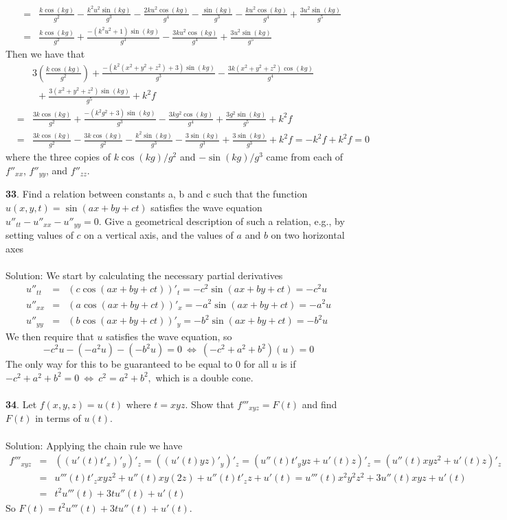 \documentclass[12pt]{amsbook}
\begin{document}
\begin{enumerate}
\begin{eqnarray*}
&=&\frac{k\cos(kg)}{g^2}-\frac{k^2u^2\sin(kg)}{g^3}-\frac{2ku^2\cos(kg)}{g^4}-\frac{\sin(kg)}{g^3}-\frac{ku^2\cos(kg)}{g^4}+\frac{3u^2\sin(kg)}{g^5} \\
&=&\frac{k\cos(kg)}{g^2}+\frac{-(k^2u^2+1)\sin(kg)}{g^3}-\frac{3ku^2\cos(kg)}{g^4}+\frac{3u^2\sin(kg)}{g^5}
\end{eqnarray*}
Then we have that
\begin{eqnarray*}
&&3(\frac{k\cos(kg)}{g^2})+\frac{-(k^2(x^2+y^2+z^2)+3)\sin(kg)}{g^3}-\frac{3k(x^2+y^2+z^2)\cos(kg)}{g^4} \\
&& \ \ +\frac{3(x^2+y^2+z^2)\sin(kg)}{g^5}+k^2f \\
&=&\frac{3k\cos(kg)}{g^2}+\frac{-(k^2g^2+3)\sin(kg)}{g^3}-\frac{3kg^2\cos(kg)}{g^4}+\frac{3g^2\sin(kg)}{g^5}+k^2f \\
&=&\frac{3k\cos(kg)}{g^2}-\frac{3k\cos(kg)}{g^2}-\frac{k^2\sin(kg)}{g^3}-\frac{3\sin(kg)}{g^3}+\frac{3\sin(kg)}{g^3}+k^2f=-k^2f+k^2f=0
\end{eqnarray*} 
where the three copies of $k\cos(kg)/g^2$ and $-\sin(kg)/g^3$ came from each of $f''_{xx}$, $f''_{yy}$, and $f''_{zz}$. 
\\
\end{enumerate}
{\small\bf 33}. Find a relation between constants a, b and c such that the function
$u(x, y, t) = \sin(ax + by + ct)$ satisfies the wave equation $u''_{tt}-u''_{xx}-u''_{yy}=0$. Give a geometrical description of such a relation, e.g., by setting values of $c$ on a vertical axis, and the values of $a$ and $b$ on two horizontal axes
\\
\\
{\sc Solution}: We start by calculating the necessary partial derivatives
\begin{eqnarray*}
u''_{tt}&=&(c\cos(ax + by + ct))'_t=-c^2\sin(ax + by + ct)=-c^2u \\
u''_{xx}&=&(a\cos(ax + by + ct))'_x=-a^2\sin(ax + by + ct)=-a^2u \\
u''_{yy}&=&(b\cos(ax + by + ct))'_y=-b^2\sin(ax + by + ct)=-b^2u 
\end{eqnarray*}
We then require that $u$ satisfies the wave equation, so
$$-c^2u-(-a^2u)-(-b^2u)=0 \ \Leftrightarrow \ (-c^2+a^2+b^2)(u)=0$$
The only way for this to be guaranteed to be equal to $0$ for all $u$ is if $-c^2+a^2+b^2=0 \ \Leftrightarrow \ c^2=a^2+b^2,$
which is a double cone.
\\
\\
{\small\bf 34}. Let $f(x, y, z) = u(t)$ where $t = xyz$. Show that $f'''_{xyz}=F(t)$ and find
$F(t)$ in terms of $u(t)$.
\\
\\
{\sc Solution}: Applying the chain rule we have
\begin{eqnarray*}
f'''_{xyz}&=&((u'(t)t'_x)'_y)'_z=((u'(t)yz)'_y)'_z
=(u''(t)t'_yyz+u'(t)z)'_z=
(u''(t)xyz^2+u'(t)z)'_z \\
&=&u'''(t)t'_zxyz^2+u''(t)xy(2z)+u''(t)t'_zz+u'(t)=u'''(t)x^2y^2z^2+3u''(t)xyz+u'(t) \\
&=&t^2u'''(t)+3tu''(t)+u'(t)
\end{eqnarray*}
So $F(t)=t^2u'''(t)+3tu''(t)+u'(t)$.
\end{document}
